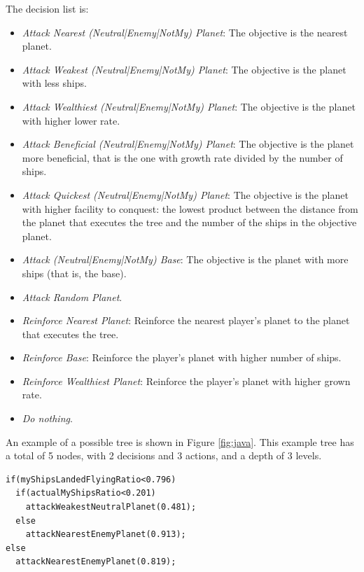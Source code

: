 The decision list is:

\begin{itemize}
\item {\em Attack Nearest (Neutral|Enemy|NotMy) Planet}: The objective is the nearest planet.
\item {\em Attack Weakest (Neutral|Enemy|NotMy) Planet}: The objective is the planet with less ships.
\item {\em Attack Wealthiest (Neutral|Enemy|NotMy) Planet}: The objective is the planet with higher lower rate.
\item {\em Attack Beneficial (Neutral|Enemy|NotMy) Planet}: The objective is the planet more beneficial, that is the one with growth rate divided by the number of ships.
\item {\em Attack Quickest (Neutral|Enemy|NotMy) Planet}: The objective is the planet with higher facility to conquest: the lowest product between the distance from the planet that executes the tree and the number of the ships in the objective planet.
\item {\em Attack (Neutral|Enemy|NotMy) Base}: The objective is the planet with more ships (that is, the base).
\item {\em  Attack Random Planet}.
\item {\em Reinforce Nearest Planet}: Reinforce the nearest player's planet to the planet that executes the tree.
\item {\em Reinforce Base}: Reinforce the player's planet with higher number of ships.
\item {\em Reinforce Wealthiest Planet}: Reinforce the player's planet with higher grown rate.
\item {\em Do nothing}.


\end{itemize}

An example of a possible tree is shown in Figure \ref{fig:java}. This example tree has a total of 5 nodes, with 2 decisions and 3 actions, and a depth of 3 levels.


\newsavebox{\javaboxrts}
\begin{lrbox}{\javaboxrts}
\begin{minipage}{10cm}
\begin{lstlisting}
if(myShipsLandedFlyingRatio<0.796)
  if(actualMyShipsRatio<0.201)
    attackWeakestNeutralPlanet(0.481);
  else
    attackNearestEnemyPlanet(0.913);
else
  attackNearestEnemyPlanet(0.819);
\end{lstlisting}
\end{minipage}
\end{lrbox}

